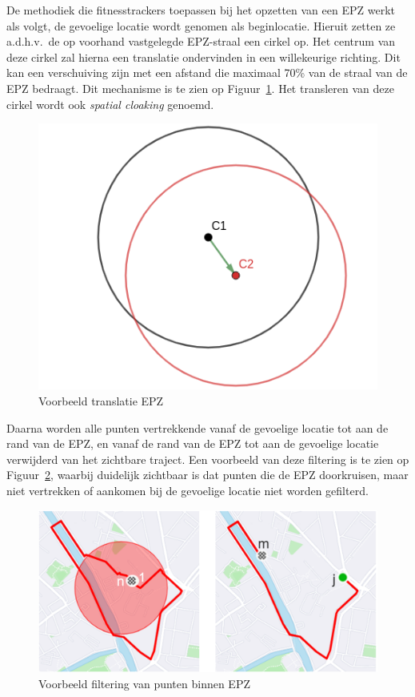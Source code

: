 De methodiek die fitnesstrackers toepassen bij het opzetten van een \ac{EPZ}
werkt als volgt, de gevoelige locatie wordt genomen als beginlocatie. Hieruit
zetten ze a.d.h.v.\ de op voorhand vastgelegde \ac{EPZ}-straal een cirkel op.
Het centrum van deze cirkel zal hierna een translatie ondervinden in een
willekeurige richting. Dit kan een verschuiving zijn met een afstand die
maximaal 70\% van de straal van de \ac{EPZ} bedraagt. Dit mechanisme is te zien
op Figuur~\ref{fig:translation}. Het transleren van deze cirkel wordt ook
\textit{spatial cloaking} genoemd.
\begin{figure}[h]
    \centering
    \includegraphics[width=0.4\linewidth]{fig/EPZ-mechanisme/Translation_Center.png}
    \caption{Voorbeeld translatie EPZ}\label{fig:translation}
\end{figure}

Daarna worden alle punten vertrekkende vanaf de gevoelige locatie tot aan de
rand van de \ac{EPZ}, en vanaf de rand van de \ac{EPZ} tot aan de gevoelige
locatie verwijderd van het zichtbare traject. Een voorbeeld van deze filtering
is te zien op Figuur~\ref{fig:drop points}, waarbij duidelijk zichtbaar is dat
punten die de \ac{EPZ} doorkruisen, maar niet vertrekken of aankomen bij de
gevoelige locatie niet worden gefilterd.
\begin{figure}[h]
    \centering
    \includegraphics[width=0.7\linewidth]{fig/EPZ-mechanisme/DropEPZPoints.png}
    \caption{Voorbeeld filtering van punten binnen EPZ~\cite{Dhondt}}\label{fig:drop points}
\end{figure}

